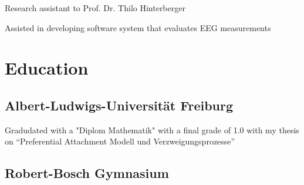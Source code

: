 \documentclass[]{deedy-resume-openfont}
\begin{document}
\begin{minipage}[t]{0.62\textwidth}
\begin{tightemize}
\item Research assistant to Prof. Dr. Thilo Hinterberger
\item Assisted in developing software system that evaluates EEG measurements
\end{tightemize}
\sectionsep


\section{Education} 

\subsection{Albert-Ludwigs-Universität Freiburg}
Gradudated with a "Diplom Mathematik" with a final grade of 1.0 with my thesis on ``Preferential Attachment Modell und Verzweigungsprozesse''

\sectionsep
\subsection{Robert-Bosch Gymnasium}
\sectionsep




\end{minipage}
\end{document}
